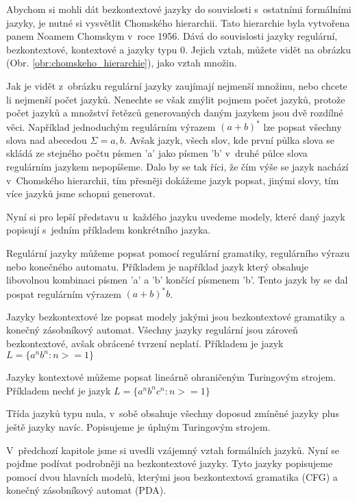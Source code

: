 Abychom si mohli dát bezkontextové jazyky do souvislosti s~ostatními formálními jazyky, je nutné si vysvětlit Chomského hierarchii. Tato hierarchie byla vytvořena panem Noamem Chomskym v~roce 1956. Dává do souvislosti jazyky regulární, bezkontextové, kontextové a jazyky typu 0. Jejich vztah, můžete vidět na obrázku (Obr. \ref{obr:chomskeho_hierarchie}), jako vztah množin.


Jak je vidět z~obrázku regulární jazyky zaujímají nejmenší množinu, nebo chcete li nejmenší počet jazyků. Nenechte se však zmýlit pojmem  počet jazyků, protože počet jazyků a množství řetězců generovaných daným jazykem jsou dvě rozdílné věci. Například jednoduchým regulárním výrazem \( (a + b)^* \) lze popsat všechny slova nad abecedou \( \Sigma = {a, b} \). Avšak jazyk, všech slov, kde první půlka slova se skládá ze stejného počtu písmen 'a' jako písmen 'b' v~druhé půlce slova regulárním jazykem nepopíšeme. Dalo by se tak říci, že čím výše se jazyk nachází v~Chomského hierarchii, tím přesněji dokážeme jazyk popsat, jinými slovy, tím více jazyků jsme schopni generovat.

Nyní si pro lepší představu u~každého jazyku uvedeme modely, které daný jazyk popisují s~jedním příkladem konkrétního jazyka.

Regulární jazyky můžeme popsat pomocí regulární gramatiky, regulárního výrazu nebo konečného automatu. Příkladem je například jazyk který obsahuje libovolnou kombinaci písmen 'a' a 'b' končící písmenem 'b'. Tento jazyk by se dal pospat regulárním výrazem \( (a + b)^* b \). 

Jazyky bezkontextové lze popsat modely jakými jsou bezkontextové gramatiky a konečný zásobníkový automat. Všechny jazyky regulární jsou zároveň bezkontextové, avšak obrácené tvrzení neplatí. Příkladem je jazyk \( L = \{ a^n b^n : n >= 1 \}  \)

Jazyky kontextové můžeme popsat lineárně ohraničeným Turingovým strojem. Příkladem nechť je jazyk \( L = \{ a^n b^n c^n : n >= 1 \}  \)

Třída jazyků typu nula, v~sobě obsahuje všechny doposud zmíněné jazyky plus ještě jazyky navíc. Popisujeme je úplným Turingovým strojem. 
\cite{Chomsky_hierarchy}

V~předchozí kapitole jsme si uvedli vzájemný vztah formálních jazyků. Nyní se pojďme podívat podrobněji na bezkontextové jazyky. Tyto jazyky popisujeme pomocí dvou hlavních modelů, kterými jsou bezkontextová gramatika (CFG) a konečný zásobníkový automat (PDA).

